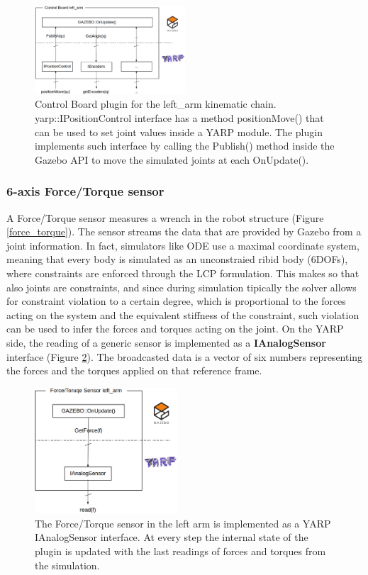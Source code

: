 \begin{figure}[h!]
  \centering
    \includegraphics[width=0.5\textwidth]{images/control_board.eps}
    \caption{Control Board plugin for the left\_arm kinematic chain. yarp::IPositionControl interface has a method positionMove() that can be used to set joint values inside a YARP module. The plugin implements such interface by calling the Publish() method inside the Gazebo API to move the simulated joints at each OnUpdate().}\label{control_board}
\end{figure}

\subsubsection{6-axis Force/Torque sensor}
A Force/Torque sensor measures a wrench in the robot structure (Figure \ref{force_torque}). The sensor streams the data that are provided by Gazebo from a joint information. In fact, simulators like ODE use a maximal coordinate system, meaning that every body is simulated as an unconstraied ribid body (6DOFs), where constraints are enforced through the LCP formulation. This makes so that also joints are constraints, and since during simulation tipically the solver allows for constraint violation to a certain degree, which is proportional to the forces acting on the system and the equivalent stiffness of the constraint, such violation can be used to infer the forces and torques acting on the joint.  On the YARP side, the reading of a generic sensor is implemented as a \textbf{IAnalogSensor} interface (Figure \ref{ianalog_force_torque}). The broadcasted data is a vector of six numbers representing the forces and the torques applied on that reference frame.

\begin{figure}[h!]
  \centering
    \includegraphics[width=0.475\textwidth]{images/ianalog_force_torque.eps}
    \caption{The Force/Torque sensor in the left arm is implemented as a YARP IAnalogSensor interface. At every step the internal state of the plugin is updated with the last readings of forces and torques from the simulation.}\label{ianalog_force_torque}
\end{figure}

